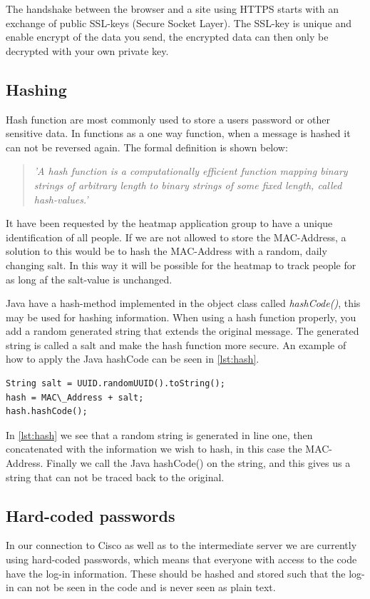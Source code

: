 The handshake between the browser and a site using HTTPS starts with an exchange of public SSL-keys (Secure Socket Layer). The SSL-key is unique and enable encrypt of the data you send, the encrypted data can then only be decrypted with your own private key\cite{HTTPS}. 

\subsection*{Hashing}
Hash function are most commonly used to store a users password or other sensitive data. In functions as a one way function, when a message is hashed it can not be reversed again. The formal definition is shown below:
\begin{quote}
\textit{'A hash function is a computationally efficient function mapping binary strings of arbitrary length to binary strings of some fixed length, called hash-values.'\cite{Hash_def}}
\end{quote}

It have been requested by the heatmap application group to have a unique identification of all people. If we are not allowed to store the MAC-Address, a solution to this would be to hash the MAC-Address with a random, daily changing salt. In this way it will be possible for the heatmap to track people for as long af the salt-value is unchanged.

Java have a hash-method implemented in the object class called \textit{hashCode()}, this may be used for hashing information. When using a hash function properly, you add a random generated string that extends the original message. The generated string is called a salt and make the hash function more secure. An example of how to apply the Java hashCode can be seen in \cref{lst:hash}.
\begin{lstlisting}[caption={Hash a MAC-Address},label={lst:hash},language=inc_Java]
String salt = UUID.randomUUID().toString();
hash = MAC\_Address + salt;
hash.hashCode();
\end{lstlisting}
In \cref{lst:hash} we see that a random string is generated in line one, then concatenated with the information we wish to hash, in this case the MAC-Address. Finally we call the Java hashCode() on the string, and this gives us a string that can not be traced back to the original.

\subsection*{Hard-coded passwords}
In our connection to Cisco as well as to the intermediate server we are currently using hard-coded passwords, which means that everyone with access to the code have the log-in information. These should be hashed and stored such that the log-in can not be seen in the code and is never seen as plain text. 


